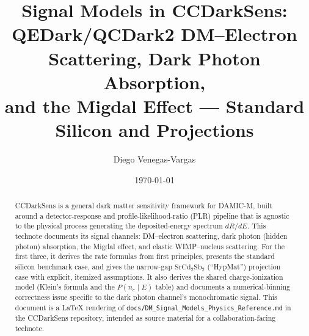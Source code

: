 \documentclass[11pt]{article}
\title{Signal Models in CCDarkSens: \\[2pt]
\large QEDark/QCDark2 DM--Electron Scattering, Dark Photon Absorption, \\
and the Migdal Effect — Standard Silicon and \SrCdSb{} Projections}
\author{Diego Venegas-Vargas}
\date{\today}
\newcommand{\SrCdSb}{\ensuremath{\mathrm{SrCd_2Sb_2}}}
\begin{document}
\maketitle

\begin{abstract}
CCDarkSens is a general dark matter sensitivity framework for DAMIC-M,
built around a detector-response and profile-likelihood-ratio (PLR)
pipeline that is agnostic to the physical process generating the
deposited-energy spectrum $dR/dE$. This technote documents its signal
channels: DM--electron scattering, dark photon (hidden photon) absorption,
the Migdal effect, and elastic WIMP--nucleus scattering. For the first
three, it derives the rate formulas from first principles, presents the
standard silicon benchmark case, and gives the narrow-gap \SrCdSb{}
(``HypMat'') projection case with explicit, itemized assumptions. It also
derives the shared charge-ionization model (Klein's formula and the
$P(n_e\mid E)$ table) and documents a numerical-binning correctness issue
specific to the dark photon channel's monochromatic signal. This document
is a LaTeX rendering of \texttt{docs/DM\_Signal\_Models\_Physics\_Reference.md}
in the CCDarkSens repository, intended as source material for a
collaboration-facing technote.
\end{abstract}

\tableofcontents










\nocite{*}


\end{document}
